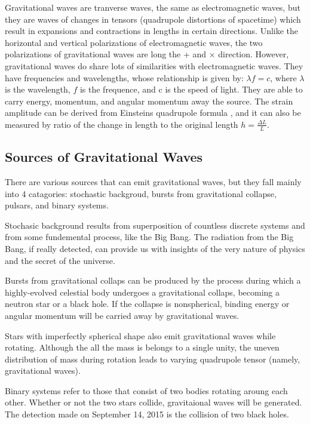 \documentclass[aps,prl,preprint]{revtex4}
\begin{document}
Gravitational waves are tranverse waves, the same as electromagnetic waves, but they are waves of changes in tensors (quadrupole distortions of spacetime) which result in expansions and contractions in lengths in certain directions. Unlike the horizontal and vertical polarizations of electromagnetic waves, the two polarizations of gravitational waves are long the + and $\times$ direction. However, gravitational waves do share lots of similarities with electromagnetic waves. They have frequencies and wavelengths, whose relationship is given by: $\lambda f=c$, where $\lambda$ is the wavelength, $f$ is the frequence, and c is the speed of light. They are able to carry energy, momentum, and angular momentum away the source. \cite{SBackground} The strain amplitude can be derived from Einsteins quadrupole formula \cite{relativity2}, and it can also be measured by ratio of the change in length to the original length $h=\frac{\Delta L}{L}$.

\subsection{Sources of Gravitational Waves}
There are various sources that can emit gravitational waves, but they fall mainly into 4 catagories: stochastic backgroud, bursts from gravitational collapse, pulsars, and binary systems.

Stochasic background results from superposition of countless discrete systems and from some fundemental process, like the Big Bang. The radiation from the Big Bang, if really detected, can provide us with insights of the very nature of physics and the secret of the universe. \cite{SBackground}

Bursts from gravitational collaps can be produced by the process during which a highly-evolved celestial body undergoes a gravitational collaps, becoming a neutron star or a black hole. If the collapse is nonspherical, binding energy or angular momentum will be carried away by gravitational waves. \cite{SBackground}

Stars with imperfectly spherical shape also emit gravitational waves while rotating. Although the all the mass is belongs to a single unity, the uneven distribution of mass during rotation leads to varying quadrupole tensor (namely, gravitational waves).

Binary systems refer to those that consist of two bodies rotating aroung each other. Whether or not the two stars collide, gravitaional waves will be generated. The detection made on September 14, 2015 is the collision of two black holes. \cite{SBackground}
\end{document}
